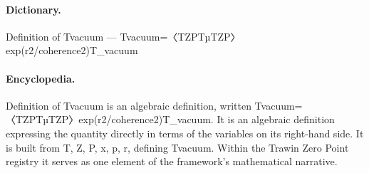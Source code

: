 \paragraph{Dictionary.}
Definition of Tvacuum — Tvacuum=〈TZPTµTZP〉exp(r2/coherence2)T\_vacuum

\paragraph{Encyclopedia.}
Definition of Tvacuum is an algebraic definition, written Tvacuum=〈TZPTµTZP〉exp(r2/coherence2)T\_vacuum. It is an algebraic definition expressing the quantity directly in terms of the variables on its right-hand side. It is built from T, Z, P, x, p, r, defining Tvacuum. Within the Trawin Zero Point registry it serves as one element of the framework's mathematical narrative.
